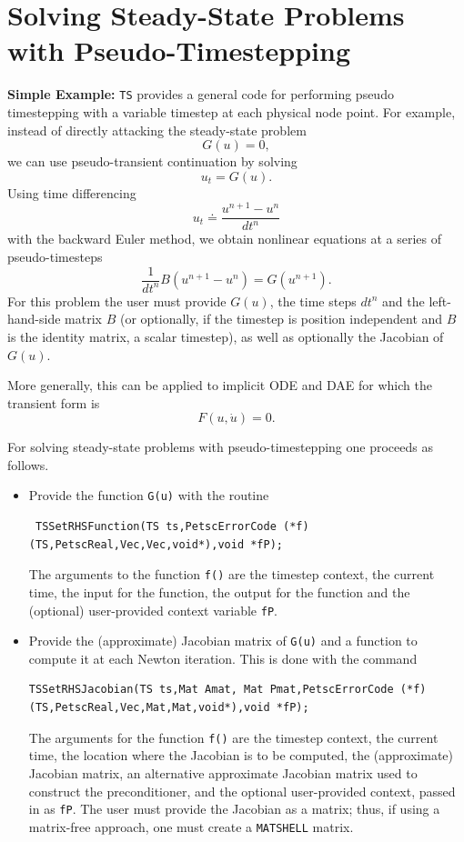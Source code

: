 \vspace{.2cm}

\cleardoublepage
\chapter{Solving Steady-State Problems with Pseudo-Timestepping}

\vspace{.2cm}

\noindent
{\bf Simple Example:}
\lstinline{TS} provides a general code for performing pseudo timestepping
with a variable timestep at each physical node point. For example, instead of
directly attacking the steady-state problem
\[
           G(u) = 0,
\]
we can use pseudo-transient continuation by solving
\[
           u_t = G(u).
\]
Using time differencing
\[
   u_t \doteq \frac{{u^{n+1}} - {u^{n}} }{dt^{n}}
\]
with the backward Euler method, we obtain
nonlinear equations at a series of pseudo-timesteps
\[
           \frac{1}{dt^n} B (u^{n+1} - u^{n} ) = G(u^{n+1}).
\]
For this problem the user must provide $G(u)$,
the time steps $dt^{n}$ and the left-hand-side matrix $B$
(or optionally, if the timestep is position independent and $B$ is the
identity matrix,
a scalar timestep), as well as optionally the Jacobian of $G(u)$.

More generally, this can be applied to implicit ODE and DAE for which
the transient form is
\[
  F(u,\dot{u}) = 0.
\]

For solving steady-state problems with pseudo-timestepping one proceeds
as follows.
\begin{itemize}
\item Provide the function \lstinline{G(u)} with the routine
\begin{lstlisting}
 TSSetRHSFunction(TS ts,PetscErrorCode (*f)(TS,PetscReal,Vec,Vec,void*),void *fP);
\end{lstlisting}
The  arguments to the function \lstinline{f()} are
the timestep context, the current time, the input for the function,
the output for the function and the (optional) user-provided context
variable \lstinline{fP}.

\item Provide the (approximate) Jacobian matrix of \lstinline{G(u)} and a
function to compute it at each Newton iteration. This is done with the command
\begin{lstlisting}
TSSetRHSJacobian(TS ts,Mat Amat, Mat Pmat,PetscErrorCode (*f)(TS,PetscReal,Vec,Mat,Mat,void*),void *fP);
\end{lstlisting}
The  arguments for the function \lstinline{f()} are
the timestep context, the current time, the location where the
Jacobian is to be computed, the (approximate) Jacobian matrix, an alternative
approximate Jacobian matrix used to construct the preconditioner, and the optional
user-provided context, passed in as \lstinline{fP}. The user must provide the
Jacobian as a matrix; thus, if using a matrix-free approach, one
must create a \lstinline{MATSHELL} matrix.
\end{itemize}


